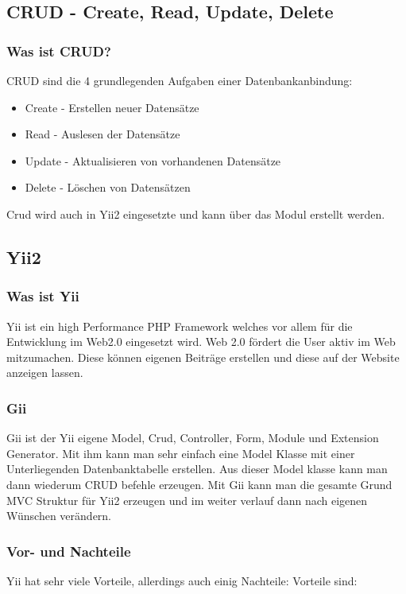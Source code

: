 	\subsection{CRUD - Create, Read, Update, Delete} \label{sec:CRUD}
	
	\subsubsection{Was ist CRUD?}
	CRUD sind die 4 grundlegenden Aufgaben einer Datenbankanbindung:
	\begin{itemize}
		\item Create - Erstellen neuer Datensätze
		\item Read - Auslesen der Datensätze
		\item Update - Aktualisieren von vorhandenen Datensätze
		\item Delete - Löschen von Datensätzen
	\end{itemize}
	
	Crud wird auch in Yii2 eingesetzte und kann über das  Modul erstellt werden. \cite{CRUD}
	
	\subsection{Yii2} \label{sec:YII2}
	
	\subsubsection{Was ist Yii}
	Yii ist ein high Performance PHP Framework welches vor allem für die Entwicklung im Web2.0 eingesetzt wird. Web 2.0 fördert die User aktiv im Web mitzumachen. Diese können eigenen Beiträge erstellen und diese auf der Website anzeigen lassen.\cite{Web_2}
	
	\subsubsection{Gii} \label{sec:gii}
	Gii ist der Yii eigene Model, Crud, Controller, Form, Module und Extension Generator. Mit ihm kann man sehr einfach eine Model Klasse mit einer Unterliegenden Datenbanktabelle erstellen. Aus dieser Model klasse kann man dann wiederum CRUD befehle erzeugen. Mit Gii kann man die gesamte Grund MVC Struktur für Yii2 erzeugen und im weiter verlauf dann nach eigenen Wünschen verändern.
	
	\subsubsection{Vor- und Nachteile}
	Yii hat sehr viele Vorteile, allerdings auch einig Nachteile:
	Vorteile sind:
	

